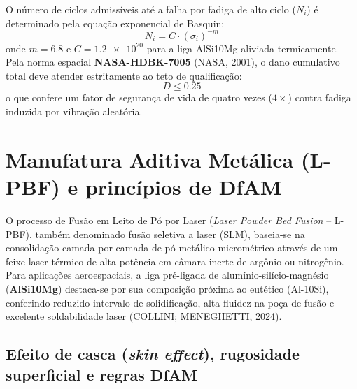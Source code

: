 O número de ciclos admissíveis até a falha por fadiga de alto ciclo ($N_i$) é determinado pela equação exponencial de Basquin:
\begin{equation}
  N_i = C \cdot \left(\sigma_i\right)^{-m}
  \label{eq:basquin-rev}
\end{equation}
onde $m = \num{6.8}$ e $C = \num{1.2e20}$ para a liga AlSi10Mg aliviada termicamente. Pela norma espacial \textbf{NASA-HDBK-7005} (NASA, 2001), o dano cumulativo total deve atender estritamente ao teto de qualificação:
\begin{equation}
  D \le \num{0.25}
  \label{eq:dano-max-rev}
\end{equation}
o que confere um fator de segurança de vida de quatro vezes ($4\times$) contra fadiga induzida por vibração aleatória.

\section{Manufatura Aditiva Metálica (L-PBF) e princípios de DfAM}
\label{sec:rev-dfam}

O processo de Fusão em Leito de Pó por Laser (\textit{Laser Powder Bed Fusion} -- L-PBF), também denominado fusão seletiva a laser (SLM), baseia-se na consolidação camada por camada de pó metálico micrométrico através de um feixe laser térmico de alta potência em câmara inerte de argônio ou nitrogênio. Para aplicações aeroespaciais, a liga pré-ligada de alumínio-silício-magnésio (\textbf{AlSi10Mg}) destaca-se por sua composição próxima ao eutético (Al-10Si), conferindo reduzido intervalo de solidificação, alta fluidez na poça de fusão e excelente soldabilidade laser (COLLINI; MENEGHETTI, 2024).

\subsection{Efeito de casca (\textit{skin effect}), rugosidade superficial e regras DfAM}
\label{subsec:rev-regras-dfam}


